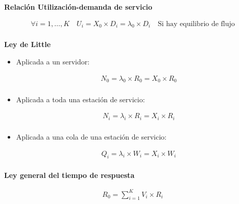 \documentclass[a4paper,12pt]{article}
\begin{document}
\textbf{Relación Utilización-demanda de servicio}

\begin{tcolorbox}[colback=yellow!5!white, colframe=yellow!75!black]
    \begin{align*}
        \forall i = 1, \ldots, K \quad U_i = X_0 \times D_i = \lambda_0 \times D_i \quad \text{Si hay equilibrio de flujo} \\
    \end{align*}
\end{tcolorbox}

\textbf{Ley de Little}

\begin{itemize}
    \item Aplicada a un servidor:
    
    \begin{tcolorbox}[colback=yellow!5!white, colframe=yellow!75!black]
        \begin{align*}
            N_0 = \lambda_0 \times R_0 = X_0 \times R_0 \\
        \end{align*}
    \end{tcolorbox}
    \item Aplicada a toda una estación de servicio:
    \begin{tcolorbox}[colback=yellow!5!white, colframe=yellow!75!black]
        \begin{align*}
            N_i = \lambda_i \times R_i = X_i \times R_i \\
        \end{align*}
    \end{tcolorbox}
    \item Aplicada a una cola de una estación de servicio:
    \begin{tcolorbox}[colback=yellow!5!white, colframe=yellow!75!black]
        \begin{align*}
            Q_i = \lambda_i \times W_i = X_i \times W_i \\
        \end{align*}
    \end{tcolorbox}
\end{itemize}

\textbf{Ley general del tiempo de respuesta}

\begin{tcolorbox}[colback=yellow!5!white, colframe=yellow!75!black]
    \begin{align*}
        R_0 = \sum_{i=1}^{K} V_i \times R_i \\ 
    \end{align*}
\end{tcolorbox}
\end{document}
